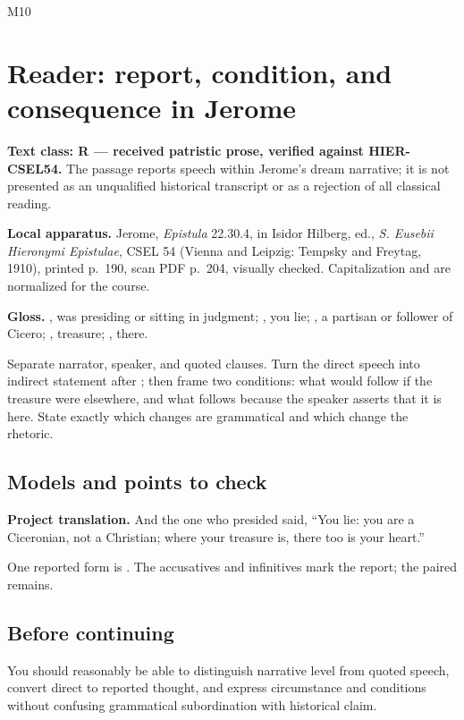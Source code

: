 \begin{courseunit}{M10}
\chapter{Reader: report, condition, and consequence in Jerome}

\textbf{Text class: R --- received patristic prose, verified against
HIER-CSEL54.} The passage reports speech within Jerome's dream narrative; it
is not presented as an unqualified historical transcript or as a rejection of
all classical reading.


\textbf{Local apparatus.} Jerome, \textit{Epistula} 22.30.4, in Isidor
Hilberg, ed., \textit{S. Eusebii Hieronymi Epistulae}, CSEL 54 (Vienna and
Leipzig: Tempsky and Freytag, 1910), printed p.~190, scan PDF p.~204, visually
checked.  Capitalization and  are normalized for the course.

\textbf{Gloss.} , was presiding or sitting in judgment;
, you lie; , a partisan or follower of
Cicero; , treasure; , there.

Separate narrator, speaker, and quoted clauses.  Turn the direct speech into
indirect statement after ; then frame two conditions: what
would follow if the treasure were elsewhere, and what follows because the
speaker asserts that it is here.  State exactly which changes are grammatical
and which change the rhetoric.

\ifsolutions
\section{Models and points to check}
\textbf{Project translation.} And the one who presided said, ``You lie: you
are a Ciceronian, not a Christian; where your treasure is, there too is your
heart.''

One reported form is .  The
accusatives and infinitives mark the report; the paired  remains.
\else
\section{Before continuing}
You should reasonably be able to distinguish narrative level from quoted
speech, convert direct to reported thought, and express circumstance and
conditions without confusing grammatical subordination with historical claim.
\fi
\end{courseunit}

